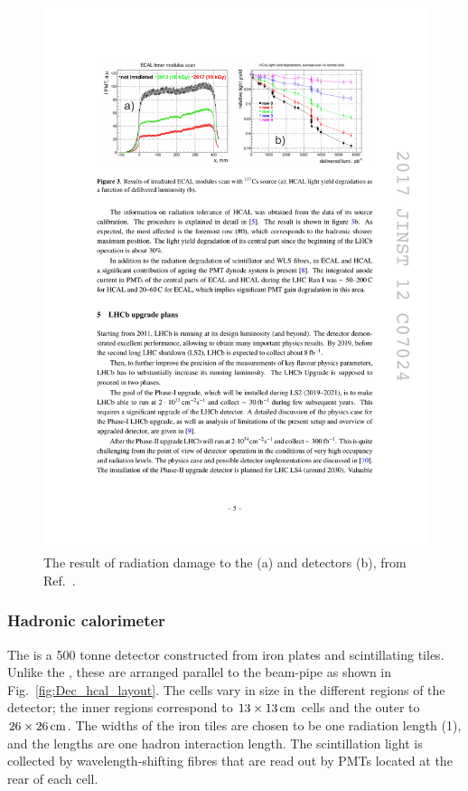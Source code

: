 \begin{figure}[!h]
    \centering        
    \includegraphics[width=1.0\textwidth]{figs/Detector/calo_performance.pdf}
    \caption{The result of radiation damage to the \ecal (a) and \hcal detectors (b), from Ref.~\cite{1748-0221-12-07-C07024}.}
    \label{fig:Dec_calo_damage}   
\end{figure}

\subsubsection{Hadronic calorimeter}

The \hcal is a 500 tonne detector constructed from iron plates and scintillating tiles. Unlike the \ecal, these are arranged parallel to the beam-pipe as shown in Fig.~\ref{fig:Dec_hcal_layout}. The cells vary in size in the different regions of the detector; the inner regions correspond to $13 \times 13 \mathrm{ \,cm}$ cells and the outer to $26\times26\mathrm{ \,cm}$. The widths of the iron tiles are chosen to be one radiation length (1\cm), and the lengths are one hadron interaction length. The scintillation light is collected by wavelength-shifting fibres that are read out by PMTs located at the rear of each cell.    



